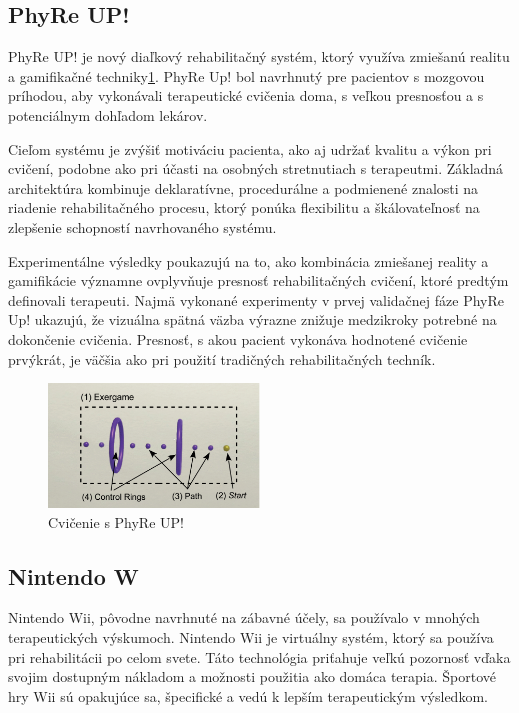 \documentclass[10pt,twoside,slovak,a4paper]{article}
\begin{document}
\subsection{PhyRe UP!}\cite{9564051}
PhyRe UP! je nový diaľkový rehabilitačný systém, ktorý využíva zmiešanú realitu a gamifikačné techniky\ref{fig:phyre}. PhyRe Up! bol navrhnutý pre pacientov s mozgovou príhodou, aby vykonávali terapeutické cvičenia doma, s veľkou presnosťou a s potenciálnym dohľadom lekárov. 

Cieľom systému je zvýšiť motiváciu pacienta, ako aj udržať kvalitu a výkon pri cvičení, podobne ako pri účasti na osobných stretnutiach s terapeutmi. Základná architektúra kombinuje deklaratívne, procedurálne a podmienené znalosti na riadenie rehabilitačného procesu, ktorý ponúka flexibilitu a škálovateľnosť na zlepšenie schopností navrhovaného systému. 

Experimentálne výsledky poukazujú na to, ako kombinácia zmiešanej reality a gamifikácie významne ovplyvňuje presnosť rehabilitačných cvičení, ktoré predtým definovali terapeuti. Najmä vykonané experimenty v prvej validačnej fáze PhyRe Up! ukazujú, že vizuálna spätná väzba výrazne znižuje medzikroky potrebné na dokončenie cvičenia. Presnosť, s akou pacient vykonáva hodnotené cvičenie prvýkrát, je väčšia ako pri použití tradičných rehabilitačných techník.

\begin{figure}[H]
    \centering
    \includegraphics[width = 0.5\textwidth]{obrazky/PhyRe UP!.png}
    \caption{Cvičenie s PhyRe UP!}
    \label{fig:phyre}
\end{figure}

\subsection{Nintendo W}\cite{8940302}
Nintendo Wii, pôvodne navrhnuté na zábavné účely, sa používalo v mnohých terapeutických výskumoch. Nintendo Wii je virtuálny systém, ktorý sa používa pri rehabilitácii po celom svete. Táto technológia priťahuje veľkú pozornosť vďaka svojim dostupným nákladom a možnosti použitia ako domáca terapia. Športové hry Wii sú opakujúce sa, špecifické a vedú k lepším terapeutickým výsledkom.
\end{document}
